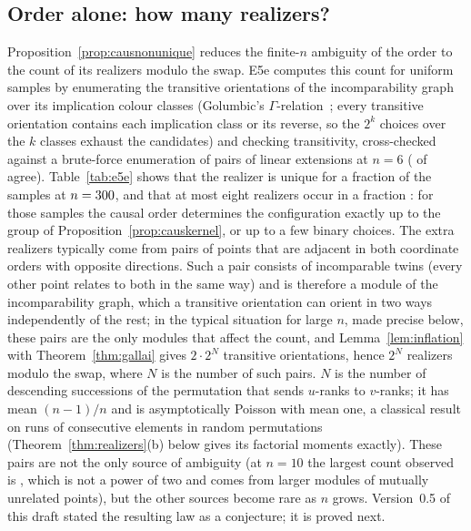 \documentclass[11pt,a4paper]{article}
\theoremstyle{plain}
\theoremstyle{definition}
\theoremstyle{remark}
\begin{document}
\subsection*{Order alone: how many realizers?}
Proposition~\ref{prop:causnonunique} reduces the finite-$n$ ambiguity of the order to the count of its realizers modulo the swap. E5e computes this count for uniform samples by enumerating the transitive orientations of the incomparability graph over its implication colour classes (Golumbic's $\Gamma$-relation~\citep{golumbic1977,golumbic1980}; every transitive orientation contains each implication class or its reverse, so the $2^k$ choices over the $k$ classes exhaust the candidates) and checking transitivity, cross-checked against a brute-force enumeration of pairs of linear extensions at $n=6$ (\EfiveEcrossAgree{} of \EfiveEcrossTested{} agree). Table~\ref{tab:e5e} shows that the realizer is unique for a fraction \EfiveEuniqueNmax{} of the samples at $n=300$, and that at most eight realizers occur in a fraction \EfiveEleEightNmax{}: for those samples the causal order determines the configuration exactly up to the group of Proposition~\ref{prop:causkernel}, or up to a few binary choices. The extra realizers typically come from pairs of points that are adjacent in both coordinate orders with opposite directions. Such a pair consists of incomparable twins (every other point relates to both in the same way) and is therefore a module of the incomparability graph, which a transitive orientation can orient in two ways independently of the rest; in the typical situation for large $n$, made precise below, these pairs are the only modules that affect the count, and Lemma~\ref{lem:inflation} with Theorem~\ref{thm:gallai} gives $2\cdot2^N$ transitive orientations, hence $2^N$ realizers modulo the swap, where $N$ is the number of such pairs. $N$ is the number of descending successions of the permutation that sends $u$-ranks to $v$-ranks; it has mean $(n-1)/n$ and is asymptotically Poisson with mean one, a classical result on runs of consecutive elements in random permutations~\citep{wolfowitz1944,kaplansky1945} (Theorem~\ref{thm:realizers}(b) below gives its factorial moments exactly). These pairs are not the only source of ambiguity (at $n=10$ the largest count observed is \EfiveEmaxCountNten, which is not a power of two and comes from larger modules of mutually unrelated points), but the other sources become rare as $n$ grows. Version~0.5 of this draft stated the resulting law as a conjecture; it is proved next.
\end{document}
